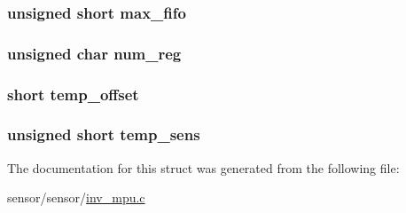 \subsubsection[{\texorpdfstring{max\+\_\+fifo}{max_fifo}}]{\setlength{\rightskip}{0pt plus 5cm}unsigned short max\+\_\+fifo}\hypertarget{structhw__s_a36e9e2aea952cea137504c539cdb97dc}{}\label{structhw__s_a36e9e2aea952cea137504c539cdb97dc}
\subsubsection[{\texorpdfstring{num\+\_\+reg}{num_reg}}]{\setlength{\rightskip}{0pt plus 5cm}unsigned char num\+\_\+reg}\hypertarget{structhw__s_a0c4fc172c338358ef1754c16c627eb08}{}\label{structhw__s_a0c4fc172c338358ef1754c16c627eb08}
\subsubsection[{\texorpdfstring{temp\+\_\+offset}{temp_offset}}]{\setlength{\rightskip}{0pt plus 5cm}short temp\+\_\+offset}\hypertarget{structhw__s_ac3cd6878189d0ca0cb389c5ab11c8395}{}\label{structhw__s_ac3cd6878189d0ca0cb389c5ab11c8395}
\subsubsection[{\texorpdfstring{temp\+\_\+sens}{temp_sens}}]{\setlength{\rightskip}{0pt plus 5cm}unsigned short temp\+\_\+sens}\hypertarget{structhw__s_ab73e7066167ecd424b3a619cddd0939a}{}\label{structhw__s_ab73e7066167ecd424b3a619cddd0939a}


The documentation for this struct was generated from the following file\+:\begin{DoxyCompactItemize}
\item 
sensor/sensor/\hyperlink{inv__mpu_8c}{inv\+\_\+mpu.\+c}\end{DoxyCompactItemize}
